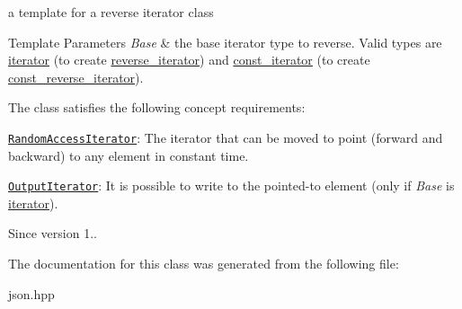 a template for a reverse iterator class 


\begin{DoxyTemplParams}{Template Parameters}
{\em Base} & the base iterator type to reverse. Valid types are \hyperlink{classnlohmann_1_1basic__json_1_1iterator}{iterator} (to create \hyperlink{classnlohmann_1_1basic__json_a2f1f83aa187a56dc5ec7a7027065ac8a}{reverse\+\_\+iterator}) and \hyperlink{classnlohmann_1_1basic__json_1_1const__iterator}{const\+\_\+iterator} (to create \hyperlink{classnlohmann_1_1basic__json_ae336fff01f4b78e3e16e5008dc8dbc00}{const\+\_\+reverse\+\_\+iterator}).\\
\hline
\end{DoxyTemplParams}
The class satisfies the following concept requirements\+:
\begin{DoxyItemize}
\item \href{http://en.cppreference.com/w/cpp/concept/RandomAccessIterator}{\tt Random\+Access\+Iterator}\+: The iterator that can be moved to point (forward and backward) to any element in constant time.
\item \href{http://en.cppreference.com/w/cpp/concept/OutputIterator}{\tt Output\+Iterator}\+: It is possible to write to the pointed-\/to element (only if {\itshape Base} is \hyperlink{classnlohmann_1_1basic__json_1_1iterator}{iterator}).
\end{DoxyItemize}

\begin{DoxySince}{Since}
version 1.. 
\end{DoxySince}


The documentation for this class was generated from the following file\+:\begin{DoxyCompactItemize}
\item 
json.\+hpp\end{DoxyCompactItemize}
